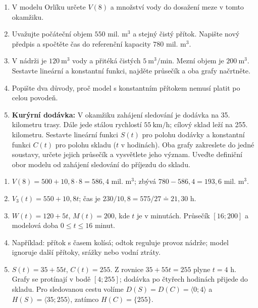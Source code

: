 \documentclass[11pt,a4paper]{article}
\begin{document}
\begin{zadaniReseniBox}[title={Domácí úkol}]
\begin{enumerate}[label=\alph*)]
\item V modelu Orlíku určete $V(8)$ a množství vody do dosažení meze v tomto okamžiku.
\item Uvažujte počáteční objem $550$ mil. $\mathrm{m}^3$ a stejný čistý přítok.
Napište nový předpis a spočtěte čas do referenční kapacity $780$ mil. $\mathrm{m}^3$.
\item V nádrži je $120\ \mathrm{m}^3$ vody a přitéká čistých $5\ \mathrm{m}^3/\mathrm{min}$.
Mezní objem je $200\ \mathrm{m}^3$. Sestavte lineární a konstantní funkci,
najděte průsečík a oba grafy načrtněte.
\item Popište dva důvody, proč model s konstantním přítokem nemusí platit po celou povodeň.
\item \textbf{Kurýrní dodávka:} V okamžiku zahájení sledování je dodávka na 35. kilometru
trasy. Dále jede stálou rychlostí $55\ \mathrm{km/h}$; cílový sklad leží na 255. kilometru.
Sestavte lineární funkci $S(t)$ pro polohu dodávky a konstantní funkci $C(t)$ pro
polohu skladu ($t$ v hodinách). Oba grafy zakreslete do jedné soustavy,
určete jejich průsečík a vysvětlete jeho význam. Uveďte definiční obor
modelu od zahájení sledování do příjezdu do skladu.
\end{enumerate}
\tcblower
\begin{enumerate}[label=\alph*)]
\item $V(8)=500+10{,}8\cdot8=586{,}4$ mil. $\mathrm{m}^3$;
zbývá $780-586{,}4=193{,}6$ mil. $\mathrm{m}^3$.
\item $V_3(t)=550+10{,}8t$; čas je $230/10{,}8=575/27\doteq21{,}30$ h.
\item $W(t)=120+5t$, $M(t)=200$, kde $t$ je v minutách.
Průsečík $[16;200]$ a modelová doba $0\le t\le16$ minut.
\item Například: přítok s časem kolísá; odtok reguluje provoz nádrže;
model ignoruje další přítoky, srážky nebo vodní ztráty.
\item $S(t)=35+55t$, $C(t)=255$. Z rovnice $35+55t=255$ plyne
$t=4$ h. Grafy se protínají v bodě $[4;255]$; dodávka po čtyřech hodinách
přijede do skladu. Pro sledovanou cestu volíme $D(S)=D(C)=\langle0;4\rangle$
a $H(S)=\langle35;255\rangle$, zatímco $H(C)=\{255\}$.
\end{enumerate}
\end{zadaniReseniBox}
\end{document}
